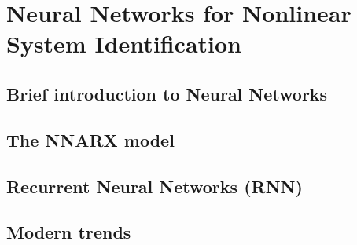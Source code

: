 \chapter{Neural Networks for Nonlinear System Identification}

\section{Brief introduction to Neural Networks}

\section{The NNARX model}

\section{Recurrent Neural Networks (RNN)}

\section{Modern trends}
